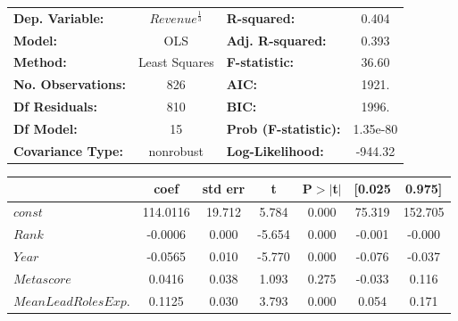     \begin{table}[H]
        \begin{center}
            \begin{tabular}{lclc}
                \toprule
                \textbf{Dep. Variable:}           &  $Revenue^{\frac{1}{3}}$   & \textbf{  R-squared:         } &     0.404   \\
                \textbf{Model:}                   &       OLS        & \textbf{  Adj. R-squared:    } &     0.393   \\
                \textbf{Method:}                  &  Least Squares   & \textbf{  F-statistic:       } &     36.60   \\
                \textbf{No. Observations:}        &         826      & \textbf{  AIC:               } &     1921.   \\
                \textbf{Df Residuals:}            &         810      & \textbf{  BIC:               } &     1996.   \\
                \textbf{Df Model:}                &          15      & \textbf{  Prob (F-statistic):} &  1.35e-80   \\
                \textbf{Covariance Type:}         &    nonrobust     & \textbf{  Log-Likelihood:    } &   -944.32   \\
                \bottomrule
            \end{tabular}
            \begin{tabular}{lcccccc}
                                                & \textbf{coef} & \textbf{std err} & \textbf{t} & \textbf{P$> |$t$|$} & \textbf{[0.025} & \textbf{0.975]}  \\
                \midrule
                \textbf{$const$}                &     114.0116  &       19.712     &     5.784  &         0.000        &       75.319    &      152.705     \\
                \textbf{$Rank$}                 &      -0.0006  &        0.000     &    -5.654  &         0.000        &       -0.001    &       -0.000     \\
                \textbf{$Year$}                 &      -0.0565  &        0.010     &    -5.770  &         0.000        &       -0.076    &       -0.037     \\
                \textbf{$Metascore$}            &       0.0416  &        0.038     &     1.093  &         0.275        &       -0.033    &        0.116     \\
                \textbf{$Mean Lead Roles Exp.$} &       0.1125  &        0.030     &     3.793  &         0.000        &        0.054    &        0.171     \\

\end{tabular}
\end{center}
\end{table}
